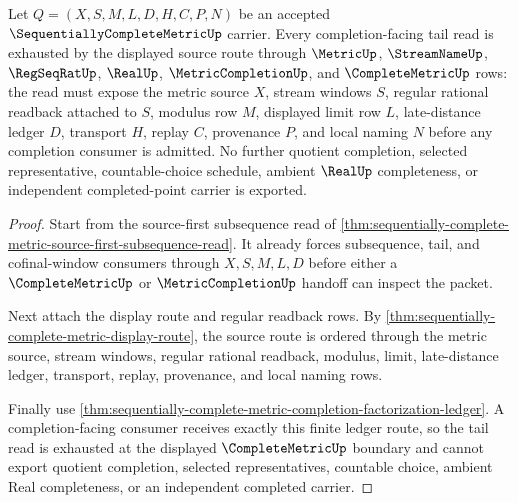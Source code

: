 \begin{theorem}
\label{thm:sequentially-complete-metric-tail-source-exhaustion}
Let $Q=(X,S,M,L,D,H,C,P,N)$ be an accepted $\SequentiallyCompleteMetricUp$ carrier. Every completion-facing tail read is exhausted by the displayed source route through $\MetricUp$, $\StreamNameUp$, $\RegSeqRatUp$, $\RealUp$, $\MetricCompletionUp$, and $\CompleteMetricUp$ rows: the read must expose the metric source $X$, stream windows $S$, regular rational readback attached to $S$, modulus row $M$, displayed limit row $L$, late-distance ledger $D$, transport $H$, replay $C$, provenance $P$, and local naming $N$ before any completion consumer is admitted. No further quotient completion, selected representative, countable-choice schedule, ambient $\RealUp$ completeness, or independent completed-point carrier is exported.
\end{theorem}
\begin{proof}
Start from the source-first subsequence read of \autoref{thm:sequentially-complete-metric-source-first-subsequence-read}. It already forces subsequence, tail, and cofinal-window consumers through $X,S,M,L,D$ before either a $\CompleteMetricUp$ or $\MetricCompletionUp$ handoff can inspect the packet.

Next attach the display route and regular readback rows. By \autoref{thm:sequentially-complete-metric-display-route}, the source route is ordered through the metric source, stream windows, regular rational readback, modulus, limit, late-distance ledger, transport, replay, provenance, and local naming rows.

Finally use \autoref{thm:sequentially-complete-metric-completion-factorization-ledger}. A completion-facing consumer receives exactly this finite ledger route, so the tail read is exhausted at the displayed $\CompleteMetricUp$ boundary and cannot export quotient completion, selected representatives, countable choice, ambient Real completeness, or an independent completed carrier.
\end{proof}
